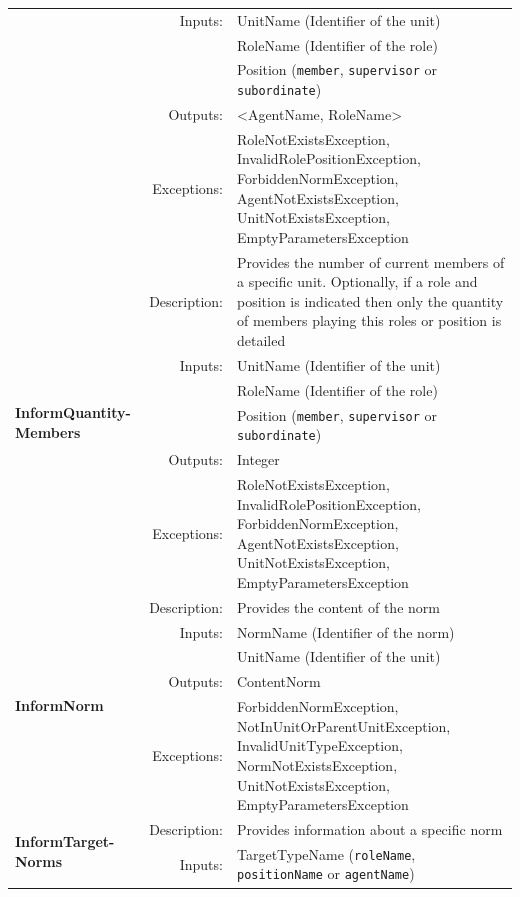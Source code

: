 \begin{longtable}{|p{3cm}|r|p{8.5cm}|}
    & Inputs: & UnitName (Identifier of the unit) \\ \cline{3-3}
    &  & RoleName (Identifier of the role) \\ \cline{3-3}
    &  & Position (\texttt{member}, \texttt{supervisor} or \texttt{subordinate}) \\ \cline{2-3}
    & Outputs:     & \textless AgentName, RoleName\textgreater \\ \cline{2-3}
    & Exceptions:  & RoleNotExistsException, InvalidRolePositionException, ForbiddenNormException, AgentNotExistsException, UnitNotExistsException, EmptyParametersException \\ \hline
  \hline
  \multirow{6}{*}{\parbox{3cm}{\textbf{InformQuantity- Members}}} & Description: & Provides the number of current members of a specific unit. Optionally, if a role and position is indicated then only the quantity of members playing this roles or position is detailed \\ \cline{2-3}
    & Inputs: & UnitName (Identifier of the unit) \\ \cline{3-3}
    &  & RoleName (Identifier of the role) \\ \cline{3-3}
    &  & Position (\texttt{member}, \texttt{supervisor} or \texttt{subordinate}) \\ \cline{2-3}
    & Outputs:     & Integer \\ \cline{2-3}
    & Exceptions:  & RoleNotExistsException, InvalidRolePositionException, ForbiddenNormException, AgentNotExistsException, UnitNotExistsException, EmptyParametersException \\ \hline
  \hline
  \multirow{5}{*}{\textbf{InformNorm}} & Description: & Provides the content of the norm \\ \cline{2-3}
    & Inputs: & NormName (Identifier of the norm) \\ \cline{3-3}
    &  & UnitName (Identifier of the unit) \\ \cline{2-3}
    & Outputs:     & ContentNorm  \\ \cline{2-3}
    & Exceptions:  & ForbiddenNormException, NotInUnitOrParentUnitException, InvalidUnitTypeException, NormNotExistsException, UnitNotExistsException, EmptyParametersException \\ \hline
  \hline
  \multirow{5}{*}{\parbox{3cm}{\textbf{InformTarget- Norms}}} & Description: & Provides information about a specific norm \\ \cline{2-3}
    & Inputs: & TargetTypeName (\texttt{roleName}, \texttt{positionName} or \texttt{agentName}) \\ \cline{3-3}

\end{longtable}

